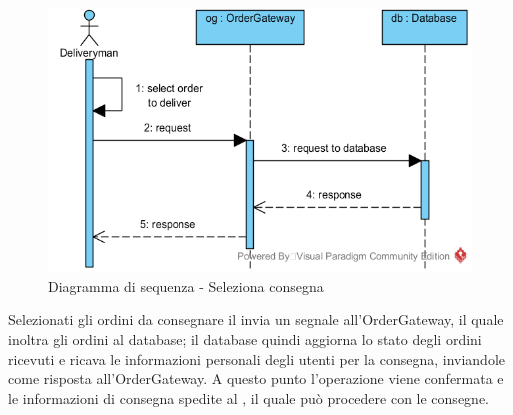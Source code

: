 \begin{figure}[H]
	\centering
	\includegraphics[width=14cm]{../../documenti/SpecificaTecnica/diagrammi_img/sequenza/fattorino_seleziona_consegna.png}
	\caption{Diagramma di sequenza - Seleziona consegna}
\end{figure}

Selezionati gli ordini da consegnare il \Deliveryman{} invia un segnale all'Order\-Gateway, il quale inoltra gli ordini al database; il database quindi aggiorna lo stato degli ordini ricevuti e ricava le informazioni personali degli utenti per la consegna, inviandole come risposta all'Order\-Gateway. A questo punto l'operazione viene confermata e le informazioni di consegna spedite al \Deliveryman{}, il quale può procedere con le consegne.


